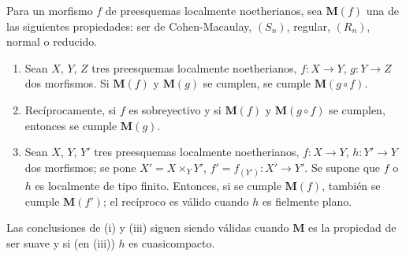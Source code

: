 \begin{proposition}[6.8.3]
\label{IV.2.s6.8.3-fr}
Para un morfismo $f$ de preesquemas localmente noetherianos, sea $\boldsymbol{M}(f)$
una de las siguientes propiedades: ser de Cohen-Macaulay, $(S_n)$, regular,
$(R_n)$, normal o reducido.
\begin{enumerate}
\item[\textup{(i)}] Sean $X$, $Y$, $Z$ tres preesquemas localmente noetherianos,
$f:X\to Y$, $g:Y\to Z$ dos morfismos. Si $\boldsymbol{M}(f)$ y $\boldsymbol{M}(g)$ se cumplen,
se cumple $\boldsymbol{M}(g\circ f)$.
\item[\textup{(ii)}] Recíprocamente, si $f$ es sobreyectivo y si $\boldsymbol{M}(f)$ y $\boldsymbol{M}(g\circ f)$
se cumplen, entonces se cumple $\boldsymbol{M}(g)$.
\item[\textup{(iii)}] Sean $X$, $Y$, $Y'$ tres preesquemas localmente noetherianos,
$f:X\to Y$, $h:Y'\to Y$ dos morfismos; se pone $X'=X\times_Y Y'$,
$f'=f_{(Y')}:X'\to Y'$. Se supone que $f$ o $h$ es localmente de tipo
finito. Entonces, si se cumple $\boldsymbol{M}(f)$, también se cumple $\boldsymbol{M}(f')$; el recíproco
es válido cuando $h$ es fielmente plano.
\end{enumerate}

Las conclusiones de \textup{(i)} y \textup{(iii)} siguen siendo válidas cuando $\boldsymbol{M}$ es la propiedad
de ser suave y si (en \textup{(iii)}) $h$ es cuasicompacto.
\end{proposition}

